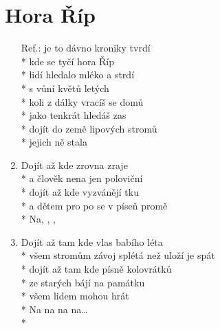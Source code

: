 \section{Hora Říp}
\begin{enumerate}
\item[Ref.:]  je to dávno kroniky tvrdí \\*
 kde se tyčí hora Říp \\*
 lidí hledalo mléko a strdí \\*
 s vůní květů letých  \\*
koli z dálky vracíš se domů \\*
 jako tenkrát hledáš zas \\*
 dojít do země lipových stromů \\*
 jejich ně stala  
\item Dojít až  kde zrovna zraje  \\*
a člověk nena jen poloviční  \\*
dojít až  kde vyzvánějí tku \\*
a dětem pro po se v píseň promě \\*
Na, , ,   
\item Dojít až tam kde vlas babího léta \\*
všem stromům závoj splétá než uloží je spát \\*
dojít až tam kde písně kolovrátků \\*
ze starých bájí na památku \\*
všem lidem mohou hrát \\*
Na na na na… \\*
\end{enumerate}
